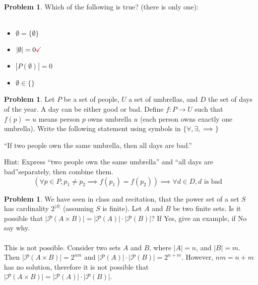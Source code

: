 \documentclass[10pt,leqno ]{article}
\theoremstyle{definition}
\newtheorem{problem}[theorem]{Problem}
\begin{document}
\begin{problem} Which  of  the  following  is  true?   (there  is  only  one):
\\\\
\begin{itemize}
\item $\emptyset=\{\emptyset\}$
\item $|\emptyset|=  0 \color{red}\checkmark$
\item $|P(\emptyset)|= 0$
\item $\emptyset \in \{ \}$
\end{itemize}
\Large

\end{problem}
\newpage

\begin{problem} Let $P$ be a set of people, $U$ a set of umbrellas, and $D$ the set of days of the year.  A day can be either good or bad.  Define $f:P \to U$ such that $f(p) =u$ means person $p$ owns umbrella $u$ (each person owns exactly one umbrella).  Write the following statement using symbols in $\{\forall,\exists,\implies\}$
\begin{center}
“If two people own the same umbrella, then all days are bad.”
\end{center}
Hint: Express “two people own the same umbrella” and “all days are bad”separately, then combine them.
\Large
$$ (\forall p \in P,  p_1 \neq p_2 \implies f(p_1) = f(p_2) ) \implies \forall d \in D, d \text{ is bad }$$
\end{problem}
\newpage

\begin{problem} We have seen in class and recitation, that the power set of a set $S$ has cardinality $2^{|S|}$ (assuming $S$ is finite).  Let $A$ and $B$ be two finite sets.  Is it possible that $|\mathcal{P}(A \times B)|=|\mathcal{P}(A)|\cdot|\mathcal{P}(B)|$?  If Yes, give an example, if No say why.
\\\\
\Large
This is not possible.  Consider two sets $A$ and $B$, where $|A| = n$, and $|B| = m$.  Then $|\mathcal{P}(A \times B)| = 2^{nm}$ and $|\mathcal{P}(A)| \cdot |\mathcal{P}(B)| = 2^{n+m}$.  However, $nm = n+m$ has no solution, therefore it is not possible that $|\mathcal{P}(A \times B)|=|\mathcal{P}(A)|\cdot|\mathcal{P}(B)|$.
\end{problem}
\newpage
\end{document}
